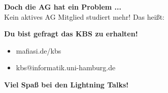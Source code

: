 \documentclass[t]{beamer}
\newcommand{\heading}[1]{{\Large\bfseries\vspace{1cm}\textcolor{darkerBlue}{#1}\\\vspace{0.65cm}}}
\begin{document}
	\begin{frame}[plain]
		\heading{Doch die AG hat ein Problem ...}
		\pause
		Kein aktives AG Mitglied studiert mehr!
		\pause
		\vspace{0.5cm}
		Das heißt:
		\begin{center}
			\textbf{Du bist gefragt das KBS zu erhalten!}
		\end{center}
		\pause
		\vspace{0.5cm}
		\begin{itemize}
			\item[\textrightarrow] mafiasi.de/kbs
			\item[\textrightarrow] kbs@informatik.uni-hamburg.de
		\end{itemize}
	\end{frame}
	
	\begin{frame}[c,plain]
		\vspace{1cm}
		\begin{center}
			\Large\textbf{Viel Spaß bei den Lightning Talks!}
		\end{center}
	\end{frame}
\end{document}
